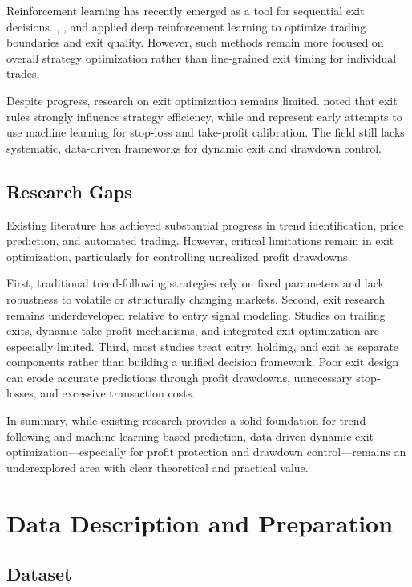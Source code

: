 \documentclass[12pt]{article}
\begin{document}
Reinforcement learning has recently emerged as a tool for sequential exit decisions. 
\citet{KimKim2019}, \citet{TsantekidisEtAl2020}, and \citet{WangEtAl2021} applied deep 
reinforcement learning to optimize trading boundaries and exit quality. However, such 
methods remain more focused on overall strategy optimization rather than fine-grained exit 
timing for individual trades.

Despite progress, research on exit optimization remains limited. \citet{HwangEtAl2023} noted 
that exit rules strongly influence strategy efficiency, while \citet{SivriEtAl2023} 
and \citet{Shawky2023} represent early attempts to use machine learning for stop-loss and 
take-profit calibration. The field still lacks systematic, data-driven frameworks for 
dynamic exit and drawdown control.

\subsection{Research Gaps}

Existing literature has achieved substantial progress in trend identification, price 
prediction, and automated trading. However, critical limitations remain in exit optimization, 
particularly for controlling unrealized profit drawdowns.

First, traditional trend-following strategies rely on fixed parameters and lack robustness to 
volatile or structurally changing markets.
Second, exit research remains underdeveloped relative to entry signal modeling. Studies on 
trailing exits, dynamic take-profit mechanisms, and integrated exit optimization are 
especially limited.
Third, most studies treat entry, holding, and exit as separate components rather than 
building a unified decision framework. Poor exit design can erode accurate predictions 
through profit drawdowns, unnecessary stop-losses, and excessive transaction costs.

In summary, while existing research provides a solid foundation for trend following and 
machine learning-based prediction, data-driven dynamic exit optimization—especially for 
profit protection and drawdown control—remains an underexplored area with clear theoretical 
and practical value.

\section{Data Description and Preparation}\label{sec:data}

\subsection{Dataset}
\end{document}
